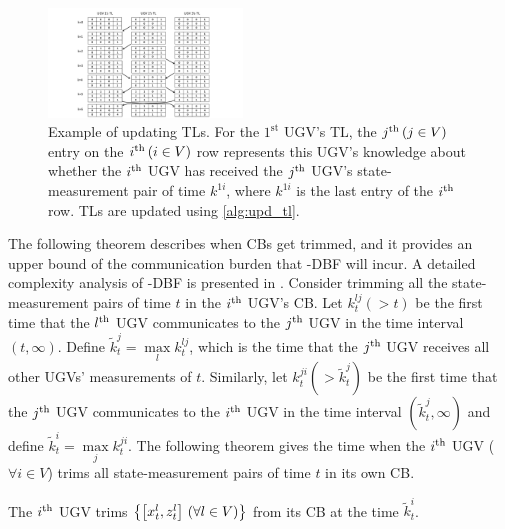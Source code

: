 	\begin{figure}%
		\centering
		\includegraphics[width=0.46\textwidth]{figures/track_list}
		\caption{Example of updating TLs. For the $1^\text{st}$ UGV's TL, the $j^\text{th}\,(j\in V)$ entry on the $i^\text{th}\,(i\in V)$ row represents this UGV's knowledge about whether the $i^\text{th}$ UGV has received the $j^\text{th}$ UGV's state-measurement pair of time $k^{1i}$, where $k^{1i}$ is the last entry of the $i^\text{th}$ row. TLs are updated using \cref{alg:upd_tl}.}
		\label{fig:upd_tl}
	\end{figure}
	
	\textcolor{\revcol}{The following theorem describes when CBs get trimmed, and it provides an upper bound of the communication burden that \proto-DBF will incur.
	A detailed complexity analysis of \proto-DBF is presented in .}
	Consider trimming all the state-measurement pairs of time $t$ in the $i^\text{th}$ UGV's CB.
	Let $k^{lj}_t (>t)$ be the first time that the $l^\text{th}$ UGV communicates to the $j^\text{th}$ UGV in the time interval $(t,\infty)$.
	Define $\tilde{k}^j_t=\max\limits_l k^{lj}_t$, which is the time that the $j^\text{th}$ UGV receives all other UGVs' measurements of $t$.
	Similarly, let $k^{ji}_t (> \tilde{k}^j_t)$ be the first time that the $j^\text{th}$ UGV communicates to the $i^\text{th}$ UGV in the time interval $(\tilde{k}^j_t,\infty)$ and define $\tilde{k}^i_t=\max\limits_j k^{ji}_t$.
	The following theorem gives the time when the $i^\text{th}$ UGV ($\forall i\in V$) trims all state-measurement pairs of time $t$ in its own CB.
	\begin{thm}\label{thm:upd_tl_freq}		
		The $i^\text{th}$ UGV trims $\left\lbrace\left[x^l_t,z^l_t\right] \,(\forall l\in V)\right\rbrace$ from its CB at the time $\tilde{k}^i_t$.
	\end{thm}
	
